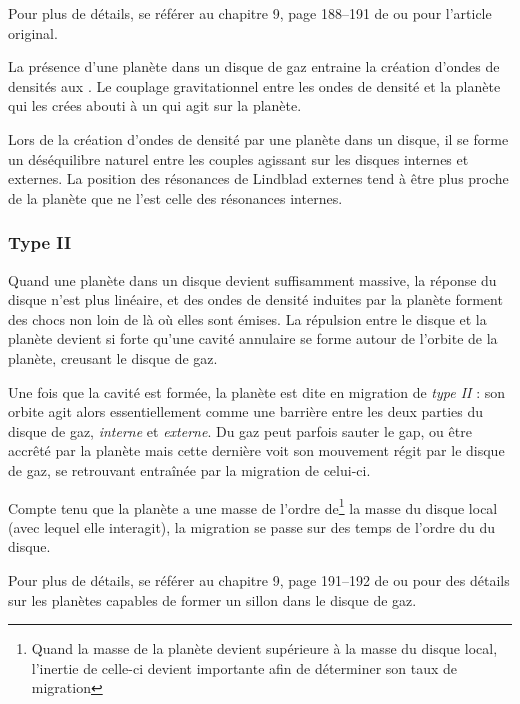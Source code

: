 \begin{remarque}
Pour plus de détails, se référer au chapitre 9, page 188--191 de \cite{barnes2010formation} ou \cite{ward1997protoplanet} pour l'article original.
\end{remarque}

La présence d'une planète dans un disque de gaz entraine la création d'ondes de densités aux  \citep{goldreich1979excitation}. Le couplage gravitationnel entre les ondes de densité et la planète qui les crées abouti à un  qui agit sur la planète.

Lors de la création d'ondes de densité par une planète dans un disque, il se forme un déséquilibre naturel entre les couples agissant sur les disques internes et externes. La position des résonances de Lindblad externes tend à être plus proche de la planète que ne l'est celle des résonances internes.


\subsubsection{Type II}
Quand une planète dans un disque devient suffisamment massive, la réponse du disque n'est plus linéaire, et des ondes de densité induites par la planète forment des chocs non loin de là où elles sont émises. La répulsion entre le disque et la planète devient si forte qu'une cavité annulaire se forme autour de l'orbite de la planète, creusant le disque de gaz.

Une fois que la cavité est formée, la planète est dite en migration de \emph{type II} : son orbite agit alors essentiellement comme une barrière entre les deux parties du disque de gaz, \emph{interne} et \emph{externe}. Du gaz peut parfois sauter le gap, ou être accrêté par la planète mais cette dernière voit son mouvement régit par le disque de gaz, se retrouvant entraînée par la migration de celui-ci.

Compte tenu que la planète a une masse de l'ordre de\footnote{Quand la masse de la planète devient supérieure à la masse du disque local, l'inertie de celle-ci devient importante afin de déterminer son taux de migration} la masse du disque local (avec lequel elle interagit), la migration se passe sur des temps de l'ordre du  du disque.

\begin{remarque}
Pour plus de détails, se référer au chapitre 9, page 191--192 de \cite{barnes2010formation} ou \cite{lin1986tidal} pour des détails sur les planètes capables de former un sillon dans le disque de gaz.
\end{remarque}
